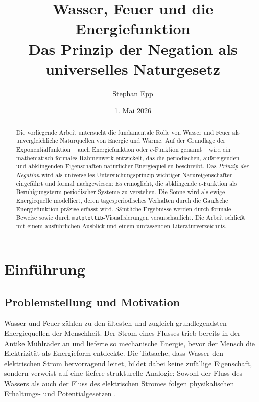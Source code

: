 ﻿\documentclass[a4paper,12pt]{article}
\title{{\bfseries Wasser, Feuer und die Energiefunktion}\\
Das Prinzip der Negation als universelles Naturgesetz}
\author{Stephan Epp}
\date{1. Mai 2026}
\theoremstyle{definition}
\begin{document}
\maketitle

\begin{abstract}
Die vorliegende Arbeit untersucht die fundamentale Rolle von Wasser und Feuer als
unvergleichliche Naturquellen von Energie und W\"arme. Auf der Grundlage der
Exponentialfunktion -- auch Energiefunktion oder $e$-Funktion genannt -- wird ein
mathematisch formales Rahmenwerk entwickelt, das die periodischen, aufsteigenden
und abklingenden Eigenschaften nat\"urlicher Energiequellen beschreibt. Das
\emph{Prinzip der Negation} wird als universelles Untersuchungsprinzip wichtiger
Natureigenschaften eingef\"uhrt und formal nachgewiesen: Es erm\"oglicht, die
abklingende $e$-Funktion als Beruhigungsterm periodischer Systeme zu verstehen.
Die Sonne wird als ewige Energiequelle modelliert, deren tagesperiodisches
Verhalten durch die Gau\ss{}sche Energiefunktion pr\"azise erfasst wird. S\"amtliche
Ergebnisse werden durch formale Beweise sowie durch \texttt{matplotlib}-Visualisierungen
veranschaulicht. Die Arbeit schlie\ss{}t mit einem ausf\"uhrlichen Ausblick und
einem umfassenden Literaturverzeichnis.
\end{abstract}

\tableofcontents
\newpage

\section{Einf\"uhrung}

\subsection{Problemstellung und Motivation}

Wasser und Feuer z\"ahlen zu den \"altesten und zugleich grundlegendsten Energiequellen
der Menschheit. Der Strom eines Flusses trieb bereits in der Antike M\"uhlr\"ader an
und lieferte so mechanische Energie, bevor der Mensch die Elektrizit\"at als
Energieform entdeckte. Die Tatsache, dass Wasser den elektrischen Strom hervorragend
leitet, bildet dabei keine zuf\"allige Eigenschaft, sondern verweist auf eine tiefere
strukturelle Analogie: Sowohl der Fluss des Wassers als auch der Fluss des elektrischen
Stromes folgen physikalischen Erhaltungs- und Potentialgesetzen \cite{Feynman1964}.
\end{document}
